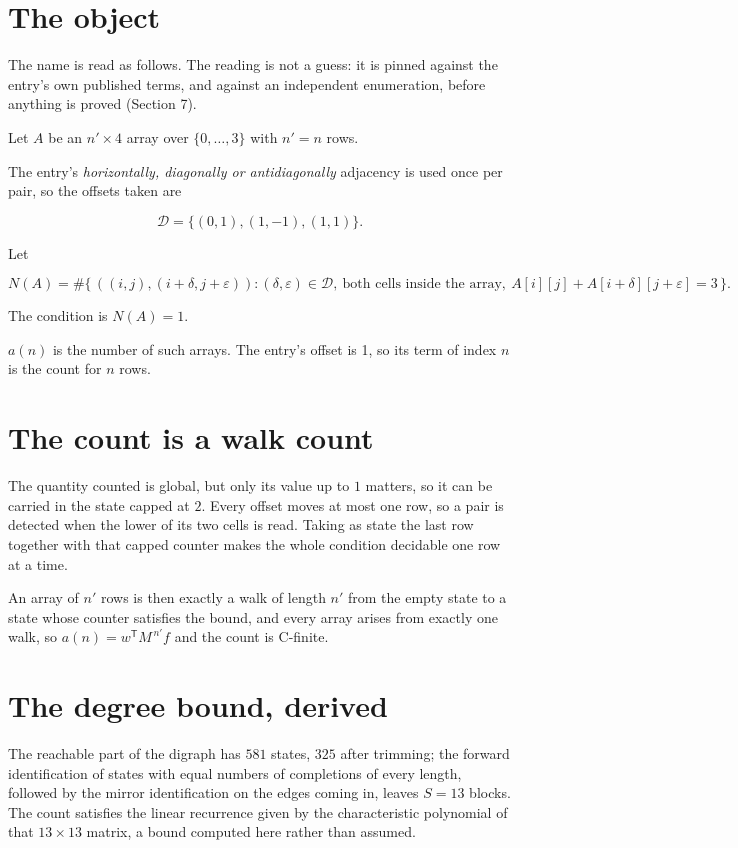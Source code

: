 \documentclass[11pt]{article}
\theoremstyle{definition}
\begin{document}
\section{The object}

The name is read as follows. The reading is not a guess: it is pinned against the entry's own published terms, and against an independent enumeration, before anything is proved (Section 7).

Let $A$ be an $n' \times 4$ array over $\{0,\dots,3\}$ with $n' = n$ rows.

The entry's {\itshape horizontally, diagonally or antidiagonally} adjacency is used once per pair, so the offsets taken are

\[\mathcal{D} = \{(0,1), (1,-1), (1,1)\}.\]

Let

\[N(A) = \#\bigl\{\,((i,j),(i{+}\delta,j{+}\varepsilon)) : (\delta,\varepsilon) \in \mathcal{D},\ \text{both cells inside the array},\ A[i][j] + A[i{+}\delta][j{+}\varepsilon] = 3\,\bigr\}.\]

The condition is $N(A) = 1$.

$a(n)$ is the number of such arrays. The entry's offset is 1, so its term of index $n$ is the count for $n$ rows.

\section{The count is a walk count}

The quantity counted is global, but only its value up to $1$ matters, so it can be carried in the state capped at $2$. Every offset moves at most one row, so a pair is detected when the lower of its two cells is read. Taking as state the last row together with that capped counter makes the whole condition decidable one row at a time.

An array of $n'$ rows is then exactly a walk of length $n'$ from the empty state to a state whose counter satisfies the bound, and every array arises from exactly one walk, so $a(n) = w^{\mathsf T}M^{\,n'}f$ and the count is C-finite.

\section{The degree bound, derived}

The reachable part of the digraph has $581$ states, $325$ after trimming; the forward identification of states with equal numbers of completions of every length, followed by the mirror identification on the edges coming in, leaves $S = 13$ blocks. The count satisfies the linear recurrence given by the characteristic polynomial of that $13\times13$ matrix, a bound computed here rather than assumed.
\end{document}
